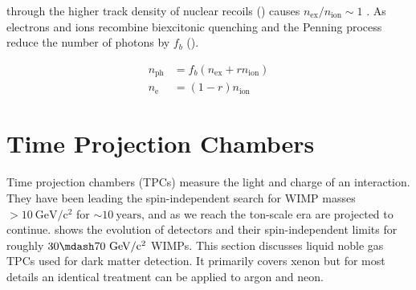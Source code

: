\noindent through the higher track density of nuclear recoils ()  causes
$n_{\mathrm{ex}} / n_{\mathrm{ion}} \sim 1$ .  As electrons and ions
recombine biexcitonic quenching and the Penning process reduce the number of photons by $f_b$ ().

\begin{subequations}
\begin{align}
n_{\mathrm{ph}} &= f_b ( n_{\mathrm{ex}} + rn_{\mathrm{ion}} ) \\
n_{\mathrm{e}} &= (1 - r)n_{\mathrm{ion}}
\end{align}
\end{subequations}



\section{Time Projection Chambers}
\label{sec:tpcs}
Time projection chambers (TPCs) measure the light and charge of an interaction.  They have been leading the
spin-independent search for WIMP masses $> 10\ \mathrm{GeV/c^2}$ for ${\sim}10\ \mathrm{years}$, and as we reach the ton-scale era are
projected to continue.   shows the evolution of detectors and their spin-independent limits for roughly
$30 \mdash 70\ \mathrm{GeV/c^2}$ WIMPs.  This section discusses liquid noble gas TPCs used for dark matter detection.  It primarily covers
xenon but for most details an identical treatment can be applied to argon and neon.

